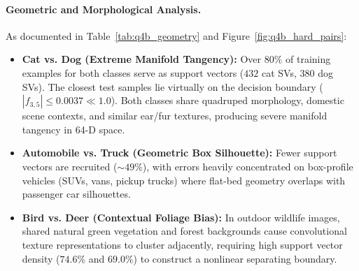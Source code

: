 \paragraph{Geometric and Morphological Analysis.}
As documented in Table~\ref{tab:q4b_geometry} and Figure~\ref{fig:q4b_hard_pairs}:
\begin{itemize}
    \item \textbf{Cat vs. Dog (Extreme Manifold Tangency):} Over $80\%$ of training examples for both classes serve as support vectors ($432$ cat SVs, $380$ dog SVs). The closest test samples lie virtually on the decision boundary ($|f_{3,5}| \le 0.0037 \ll 1.0$). Both classes share quadruped morphology, domestic scene contexts, and similar ear/fur textures, producing severe manifold tangency in 64-D space.
    \item \textbf{Automobile vs. Truck (Geometric Box Silhouette):} Fewer support vectors are recruited ($\sim 49\%$), with errors heavily concentrated on box-profile vehicles (SUVs, vans, pickup trucks) where flat-bed geometry overlaps with passenger car silhouettes.
    \item \textbf{Bird vs. Deer (Contextual Foliage Bias):} In outdoor wildlife images, shared natural green vegetation and forest backgrounds cause convolutional texture representations to cluster adjacently, requiring high support vector density ($74.6\%$ and $69.0\%$) to construct a nonlinear separating boundary.
\end{itemize}

\begin{table}[!htbp]
\centering
\caption{Q4(c) Train-Only Label-Free Clustering Model Selection across candidate cluster counts $K$ on $5{,}000$ training representations.}
\label{tab:q4c_selection}
\end{table}

